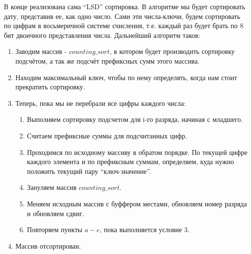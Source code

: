 В конце реализована сама \enquote{LSD} сортировка. В алгоритме мы будет сортировать дату, представив ее, как одно число. Сами эти числа-ключи, будем сортировать по цифрам в восьмеричной системе счисления, т.е. каждый раз будет брать по 8 бит двоичного представления числа. Дальнейший алгоритм таков:
\begin{enumerate}
    \item Заводим массив - $counting\_sort$, в котором будет производить сортировку подсчётом, а так же подсчёт префиксных сумм этого массива.
    \item Находим максимальный ключ, чтобы по нему определять, когда нам стоит прекратить сортировку.
    \item Теперь, пока мы не перебрали все цифры каждого числа:
        \begin{enumerate}
            \item Выполняем сортировку подсчетом для i-го разряда, начиная с младшего.
            \item Считаем префиксные суммы для подсчитанных цифр.
            \item Проходимся по исходному массиву в обратом порядке. По текущей цифре каждого элемента и по префиксным суммам, определяем, куда нужно положить текущий пару \enquote{ключ-значение}.
            \item Зануляем массив $counting\_sort$.
            \item Меняем исходным массив с буффером местами, обновляем номер разряда и обновляем сдвиг.
            \item Повторяем пункты $a-e$, пока выполняется условие $3$.
        \end{enumerate}
    \item  Массив отсортирован.
\end{enumerate}

